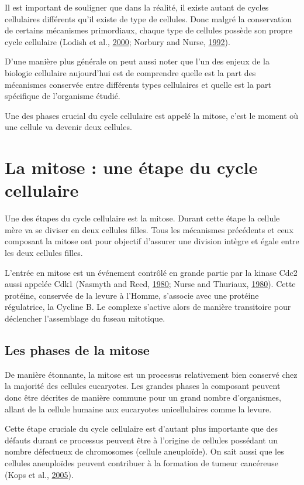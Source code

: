 \documentclass[12pt,a4paper,twoside,openright]{book}
\begin{document}
Il est important de souligner que dans la réalité, il existe autant de
cycles cellulaires différents qu'il existe de type de cellules. Donc
malgré la conservation de certains mécanismes primordiaux, chaque type
de cellules possède son propre cycle cellulaire (Lodish et al.,
\protect\hyperlink{ref-Lodish2000}{2000}; Norbury and Nurse,
\protect\hyperlink{ref-Norbury1992}{1992}).

D'une manière plus générale on peut aussi noter que l'un des enjeux de
la biologie cellulaire aujourd'hui est de comprendre quelle est la part
des mécanismes conservée entre différents types cellulaires et quelle
est la part spécifique de l'organisme étudié.

Une des phases crucial du cycle cellulaire est appelé la mitose, c'est
le moment où une cellule va devenir deux cellules.

\section{La mitose : une étape du cycle
cellulaire}\label{la-mitose-une-uxe9tape-du-cycle-cellulaire}

Une des étapes du cycle cellulaire est la mitose. Durant cette étape la
cellule mère va se diviser en deux cellules filles. Tous les mécanismes
précédents et ceux composant la mitose ont pour objectif d'assurer une
division intègre et égale entre les deux cellules filles.

L'entrée en mitose est un événement contrôlé en grande partie par la
kinase Cdc2 aussi appelée Cdk1 (Nasmyth and Reed,
\protect\hyperlink{ref-Nasmyth1980}{1980}; Nurse and Thuriaux,
\protect\hyperlink{ref-Nurse1980}{1980}). Cette protéine, conservée de
la levure à l'Homme, s'associe avec une protéine régulatrice, la Cycline
B. Le complexe s'active alors de manière transitoire pour déclencher
l'assemblage du fuseau mitotique.

\subsection{Les phases de la mitose}\label{les-phases-de-la-mitose}

De manière étonnante, la mitose est un processus relativement bien
conservé chez la majorité des cellules eucaryotes. Les grandes phases la
composant peuvent donc être décrites de manière commune pour un grand
nombre d'organismes, allant de la cellule humaine aux eucaryotes
unicellulaires comme la levure.

Cette étape cruciale du cycle cellulaire est d'autant plus importante
que des défauts durant ce processus peuvent être à l'origine de cellules
possédant un nombre défectueux de chromosomes (cellule aneuploïde). On
sait aussi que les cellules aneuploïdes peuvent contribuer à la
formation de tumeur cancéreuse (Kops et al.,
\protect\hyperlink{ref-Kops2005}{2005}).
\end{document}
